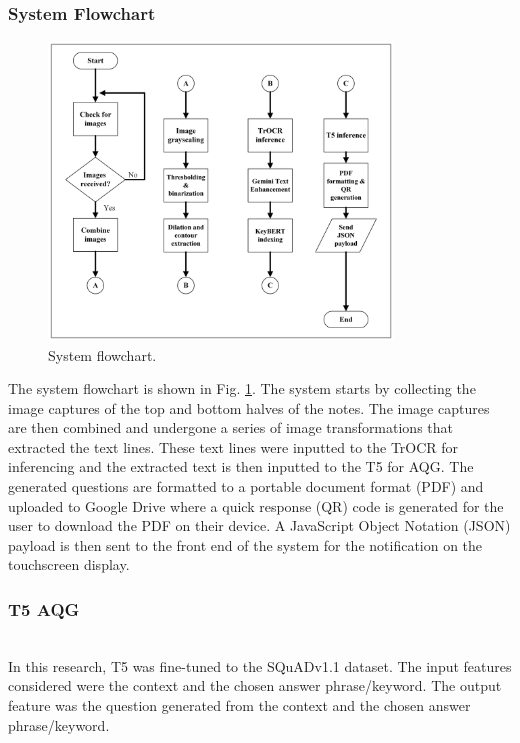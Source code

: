 \documentclass[conference]{IEEEtran}
\begin{document}
        \subsubsection{System Flowchart}
            \hfill 
            \begin{figure}[H]
                \centerline{\includegraphics[width=3.6in]{flowchart.png}}
                \vspace{-0.4cm}
                \caption{System flowchart.} 
                \label{flowchart}
            \end{figure}
            \indent The system flowchart is shown in 
           Fig. \ref{flowchart}. The system 
           starts by collecting
           the image captures of the top and bottom halves 
           of the notes. The image captures are then
           combined and undergone a series of image 
           transformations that extracted the text lines. 
           These text lines were inputted to the TrOCR for 
           inferencing and the extracted text is then
           inputted to the T5 for AQG. The generated
           questions are formatted to a portable document
              format (PDF) and uploaded to Google Drive 
            where a quick response (QR) code is generated for the user to download 
            the PDF on their device. A JavaScript 
            Object Notation (JSON) payload is then sent 
            to the front end of the system for the 
            notification on the touchscreen display.
        \vspace{0.4cm}
        \subsubsection{T5 AQG}
        \hfill \\
            \indent In this research, T5 was fine-tuned 
            to the SQuADv1.1 dataset. The input features 
            considered were the context and the chosen 
            answer phrase/keyword. The output feature
            was the question generated from the context
            and the chosen answer phrase/keyword. 
            
\end{document}
